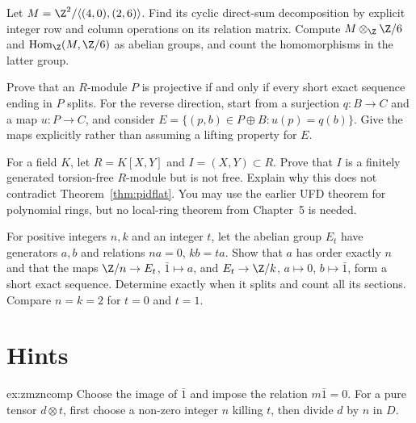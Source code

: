 \begin{exercise}[$\star$]\label{ex:v10exp-ch03-presentation}
Let $M=\Z^2/\langle(4,0),(2,6)\rangle$. Find its cyclic direct-sum decomposition by explicit integer row and column operations on its relation matrix. Compute $M\otimes_\Z\Z/6$ and $\operatorname{Hom}_\Z(M,\Z/6)$ as abelian groups, and count the homomorphisms in the latter group.
\end{exercise}

\begin{exercise}[$\star\star$]\label{ex:v10exp-ch03-projective-splitting}
Prove that an $R$-module $P$ is projective if and only if every short exact sequence ending in $P$ splits. For the reverse direction, start from a surjection $q:B\to C$ and a map $u:P\to C$, and consider $E=\{(p,b)\in P\oplus B:u(p)=q(b)\}$. Give the maps explicitly rather than assuming a lifting property for $E$.
\end{exercise}

\begin{exercise}[$\star\star$]\label{ex:v10exp-ch03-pid-hypothesis}
For a field $K$, let $R=K[X,Y]$ and $I=(X,Y)\subset R$. Prove that $I$ is a finitely generated torsion-free $R$-module but is not free. Explain why this does not contradict Theorem~\ref{thm:pidflat}. You may use the earlier UFD theorem for polynomial rings, but no local-ring theorem from Chapter~5 is needed.
\end{exercise}

\begin{exercise}[$\star\star\star$]\label{ex:v10exp-ch03-extensions}
For positive integers $n,k$ and an integer $t$, let the abelian group $E_t$ have generators $a,b$ and relations $na=0$, $kb=ta$. Show that $a$ has order exactly $n$ and that the maps $\Z/n\to E_t$, $\bar1\mapsto a$, and $E_t\to\Z/k$, $a\mapsto0$, $b\mapsto\bar1$, form a short exact sequence. Determine exactly when it splits and count all its sections. Compare $n=k=2$ for $t=0$ and $t=1$.
\end{exercise}

\section{Hints}

\begin{hint}{ex:zmzncomp}
Choose the image of $\bar1$ and impose the relation $m\bar1=0$. For a pure tensor $d\otimes t$, first choose a non-zero integer $n$ killing $t$, then divide $d$ by $n$ in $D$.
\end{hint}

